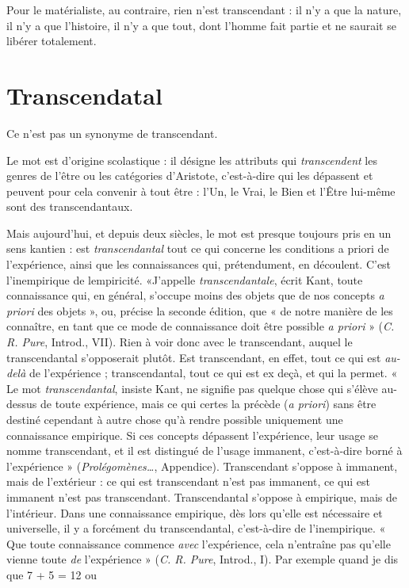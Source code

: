 Pour le matérialiste, au contraire, rien n’est transcendant : il n’y a que la
nature, il n’y a que l’histoire, il n’y a que tout, dont l’homme fait partie et ne
saurait se libérer totalement.

\section{Transcendatal}
Ce n’est pas un synonyme de transcendant.

Le mot est d’origine scolastique : il désigne les attributs
qui {\it transcendent} les genres de l’être ou les catégories d’Aristote, c’est-à-dire
qui les dépassent et peuvent pour cela convenir à tout être : l’Un, le Vrai, le
Bien et l’Être lui-même sont des transcendantaux.

Mais aujourd’hui, et depuis deux siècles, le mot est presque toujours pris en
un sens kantien : est {\it transcendantal} tout ce qui concerne les conditions a priori de
l'expérience, ainsi que les connaissances qui, prétendument, en découlent. C’est
l’inempirique de lempiricité. «J'appelle {\it transcendantale}, écrit Kant, toute
connaissance qui, en général, s’occupe moins des objets que de nos concepts {\it a
priori} des objets », ou, précise la seconde édition, que « de notre manière de les
connaître, en tant que ce mode de connaissance doit être possible {\it a priori} »
({\it C. R. Pure}, Introd., VII). Rien à voir donc avec le transcendant, auquel le transcendantal
s’opposerait plutôt. Est transcendant, en effet, tout ce qui est {\it au-delà}
de l’expérience ; transcendantal, tout ce qui est ex deçà, et qui la permet. « Le mot
{\it transcendantal}, insiste Kant, ne signifie pas quelque chose qui s’élève au-dessus de
toute expérience, mais ce qui certes la précède ({\it a priori}) sans être destiné cependant
à autre chose qu’à rendre possible uniquement une connaissance empirique.
Si ces concepts dépassent l’expérience, leur usage se nomme transcendant, et il est
distingué de l’usage immanent, c’est-à-dire borné à l’expérience » ({\it Prolégomènes…},
Appendice). Transcendant s'oppose à immanent, mais de l’extérieur :
ce qui est transcendant n’est pas immanent, ce qui est immanent n’est pas transcendant.
Transcendantal s'oppose à empirique, mais de l’intérieur. Dans une
connaissance empirique, dès lors qu’elle est nécessaire et universelle, il y a forcément
du transcendantal, c’est-à-dire de l’inempirique. « Que toute connaissance
commence {\it avec} l'expérience, cela n’entraîne pas qu’elle vienne toute {\it de}
l'expérience » ({\it C. R. Pure}, Introd., I). Par exemple quand je dis que 7 + 5 = 12 ou
